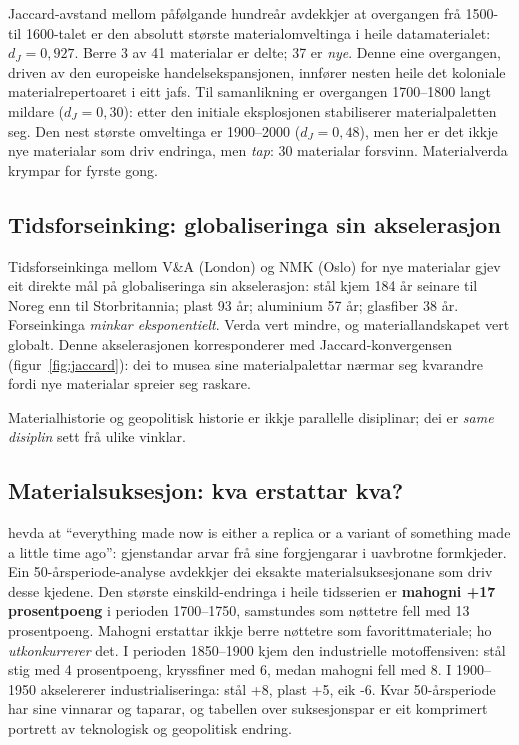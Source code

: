 \documentclass[10pt, a4paper, twocolumn]{article}
\begin{document}
Jaccard-avstand mellom påfølgande hundreår avdekkjer at overgangen frå 1500- til 1600-talet er den absolutt største materialomveltinga i heile datamaterialet: $d_J = 0{,}927$. Berre 3 av 41 materialar er delte; 37 er \emph{nye}. Denne eine overgangen, driven av den europeiske handelsekspansjonen, innfører nesten heile det koloniale materialrepertoaret i eitt jafs. Til samanlikning er overgangen 1700--1800 langt mildare ($d_J = 0{,}30$): etter den initiale eksplosjonen stabiliserer materialpaletten seg. Den nest største omveltinga er 1900--2000 ($d_J = 0{,}48$), men her er det ikkje nye materialar som driv endringa, men \emph{tap}: 30 materialar forsvinn. Materialverda krympar for fyrste gong.

\subsection{Tidsforseinking: globaliseringa sin akselerasjon}

Tidsforseinkinga mellom V\&A (London) og NMK (Oslo) for nye materialar gjev eit direkte mål på globaliseringa sin akselerasjon: stål kjem 184 år seinare til Noreg enn til Storbritannia; plast 93 år; aluminium 57 år; glasfiber 38 år. Forseinkinga \emph{minkar eksponentielt}. Verda vert mindre, og materiallandskapet vert globalt. Denne akselerasjonen korresponderer med Jaccard-konvergensen (figur~\ref{fig:jaccard}): dei to musea sine materialpalettar nærmar seg kvarandre fordi nye materialar spreier seg raskare.

Materialhistorie og geopolitisk historie er ikkje parallelle disiplinar; dei er \emph{same disiplin} sett frå ulike vinklar.

\subsection{Materialsuksesjon: kva erstattar kva?}

\citet{kubler_shape_1962} hevda at ``everything made now is either a replica or a variant of something made a little time ago'': gjenstandar arvar frå sine forgjengarar i uavbrotne formkjeder. Ein 50-årsperiode-analyse avdekkjer dei eksakte materialsuksesjonane som driv desse kjedene. Den største einskild-endringa i heile tidsserien er \textbf{mahogni +17 prosentpoeng} i perioden 1700--1750, samstundes som nøttetre fell med 13 prosentpoeng. Mahogni erstattar ikkje berre nøttetre som favorittmateriale; ho \emph{utkonkurrerer} det. I perioden 1850--1900 kjem den industrielle motoffensiven: stål stig med 4 prosentpoeng, kryssfiner med 6, medan mahogni fell med 8. I 1900--1950 akselererer industrialiseringa: stål +8, plast +5, eik -6. Kvar 50-årsperiode har sine vinnarar og taparar, og tabellen over suksesjonspar er eit komprimert portrett av teknologisk og geopolitisk endring.
\end{document}
